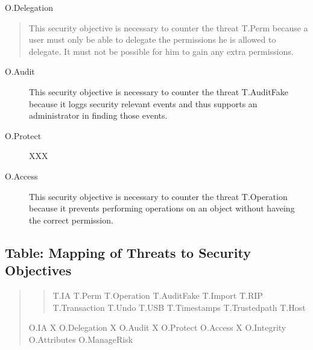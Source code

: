 \documentclass[10pt,a4paper,english]{book}
\begin{document}
O.Delegation
\begin{quote}

This security objective is necessary to counter the threat T.Perm
because a user must only be able to delegate the permissions he
is allowed to delegate. It must not be possible for him to gain
any extra permissions.
\end{quote}
\begin{description}
\item[O.Audit]

This security objective is necessary to counter the threat T.AuditFake
because it loggs security relevant events and thus supports an 
administrator in finding those events.

\item[O.Protect]

XXX

\item[O.Access]

This security objective is necessary to counter the threat T.Operation
because it prevents performing operations on an object without haveing the
correct permission.

\end{description}



\hypertarget{table-mapping-of-threats-to-security-objectives}{}
\subsection{Table: Mapping of Threats to Security Objectives}
\begin{quote}
\begin{quote}

T.IA    T.Perm  T.Operation T.AuditFake T.Import    T.RIP T.Transaction T.Undo    T.USB T.Timestamps    T.Trustedpath   T.Host
\end{quote}

O.IA            X
O.Delegation             X
O.Audit                                          X                                    
O.Protect                                           
O.Access                        X
O.Integrity
O.Attributes
O.ManageRisk
\end{quote}
\end{document}

